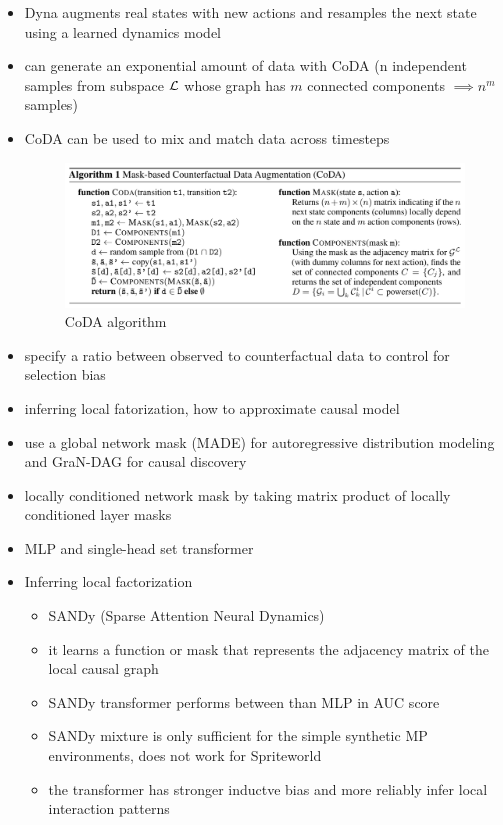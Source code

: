 \begin{itemize}
\begin{figure}[h]
  \end{figure}
  \item Dyna augments real states with new actions and resamples the next state using a learned dynamics model
  \item can generate an exponential amount of data with CoDA (n independent samples from subspace $\mathcal{L}$ whose graph has $m$ connected components $\implies n^{m}$ samples)
  \item CoDA can be used to mix and match data across timesteps
  \begin{figure}[h]
    \caption{CoDA algorithm}
    \centering
    \includegraphics[width=\textwidth]{../../imgs/coda_diagram.png}
  \end{figure}
  \item specify a ratio between observed to counterfactual data to control for selection bias
  \item inferring local fatorization, how to approximate causal model
  \item use a global network mask (MADE) for autoregressive distribution modeling and GraN-DAG for causal discovery
  \item locally conditioned network mask by taking matrix product of locally conditioned layer masks
  \item MLP and single-head set transformer
  \item Inferring local factorization
  \begin{itemize}
    \item SANDy (Sparse Attention Neural Dynamics)
    \item it learns a function or mask that represents the adjacency matrix of the local causal graph
    \item SANDy transformer performs between than MLP in AUC score
    \item SANDy mixture is only sufficient for the simple synthetic MP environments, does not work for Spriteworld
    \item the transformer has stronger inductve bias and more reliably infer local interaction patterns

\end{itemize}
\end{itemize}
